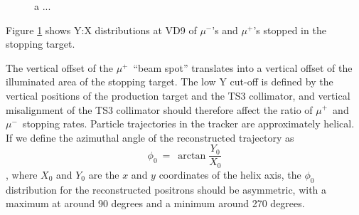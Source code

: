 \documentclass[12pt]{article}
\newcommand {\muminus}    {\mbox{$\mu^-$}}
\newcommand {\muplus}    {\mbox{$\mu^+$}}
\begin{document}
\begin{figure}[H]
  \hspace{-0.5in}
  \caption{
    \label{fig:03103_bmum0s31b0_vdet_309_y_vs_x}
    a ... 
  }
\end{figure}

Figure \ref{fig:03103_bmum0s31b0_vdet_309_y_vs_x} shows Y:X distributions at VD9 of \muminus's
and \muplus's stopped in the stopping target.

The vertical offset of the \muplus\ ``beam spot'' translates into a vertical offset of the illuminated
area of the stopping target. The low Y cut-off is defined by the vertical positions of the production target
and the TS3 collimator, and vertical misalignment of the TS3 collimator should therefore affect the ratio
of \muplus\ and \muminus\ stopping rates. 
%
Particle trajectories in the tracker are approximately helical. If we define the azimuthal angle
of the reconstructed trajectory as 
$$
\phi_0  ~=~ \arctan \frac{Y_0}{X_0}
$$
, where $X_0$ and $Y_0$ are the $x$ and $y$ coordinates of the helix axis,
the $\phi_0$ distribution for the reconstructed positrons should be asymmetric, 
with a maximum at around 90 degrees and a minimum around 270 degrees. 
\end{document}
